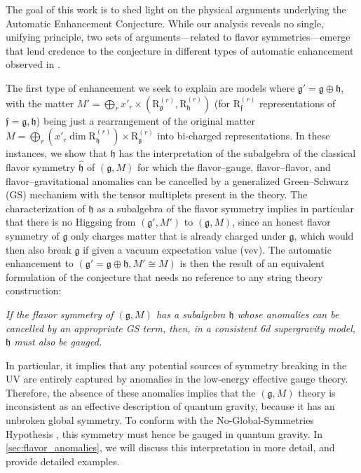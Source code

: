 \documentclass[11pt, a4paper]{article}
\newcommand*{\fkf}{\ensuremath{\mathfrak{f}}}
\newcommand*{\fkg}{\ensuremath{\mathfrak{g}}}
\newcommand*{\fkh}{\ensuremath{\mathfrak{h}}}
\newcommand*{\irrep}[2]{\ensuremath{\bm{\mathrm{R}}_{#1}^{(#2)}}}
\begin{document}
The goal of this work is to shed light on the physical arguments underlying the Automatic Enhancement Conjecture.
While our analysis reveals no single, unifying principle, two sets of arguments---related to flavor symmetries---emerge that lend credence to the conjecture in different types of automatic enhancement observed in \cite{Raghuram:2020vxm}.

The first type of enhancement we seek to explain are models where $\fkg' = \fkg \oplus \fkh$, with the matter $M' = \bigoplus_{r} x'_{r} \times (\irrep{\fkg}{r}, \irrep{\fkh}{r})$ (for $\irrep{\fkf}{r}$ representations of $\fkf = \fkg, \fkh$) being just a rearrangement of the original matter $M = \bigoplus_{r} (x'_{r} \dim \irrep{\fkh}{r}) \times  \irrep{\fkg}{r}$ into bi-charged representations.
In these instances, we show that $\fkh$ has the interpretation of the subalgebra of the classical flavor symmetry $\hat{\fkh}$ of $(\fkg, M)$ for which the flavor--gauge, flavor--flavor, and flavor--gravitational anomalies can be cancelled by a generalized Green--Schwarz (GS) mechanism \cite{Green:1984bx,Sagnotti:1992qw} with the tensor multiplets present in the theory.
The characterization of $\fkh$ as a subalgebra of the flavor symmetry implies in particular that there is no Higgsing from $(\fkg', M')$ to $(\fkg, M)$, since an honest flavor symmetry of $\fkg$ only charges matter that is already charged under $\fkg$, which would then also break $\fkg$ if given a vacuum expectation value (vev).
The automatic enhancement to $(\fkg' = \fkg \oplus \fkh, M' \cong M)$ is then the result of an equivalent formulation of the conjecture that needs no reference to any string theory construction:
\begin{center}
\emph{If the flavor symmetry of $(\fkg, M)$ has a subalgebra $\fkh$ whose anomalies can be cancelled by an appropriate GS term, then, in a consistent 6d supergravity model, $\fkh$ must also be gauged.}
\end{center}
In particular, it implies that any potential sources of symmetry breaking in the UV are entirely captured by anomalies in the low-energy effective gauge theory.
Therefore, the absence of these anomalies implies that the $(\fkg, M)$ theory is inconsistent as an effective description of quantum gravity, because it has an unbroken global symmetry.
To conform with the No-Global-Symmetries Hypothesis \cite{Banks:2010zn,ArkaniHamed:2006dz,Polchinski:2003bq}, this symmetry must hence be gauged in quantum gravity.
In \cref{sec:flavor_anomalies}, we will discuss this interpretation in more detail, and provide detailed examples.
\end{document}
